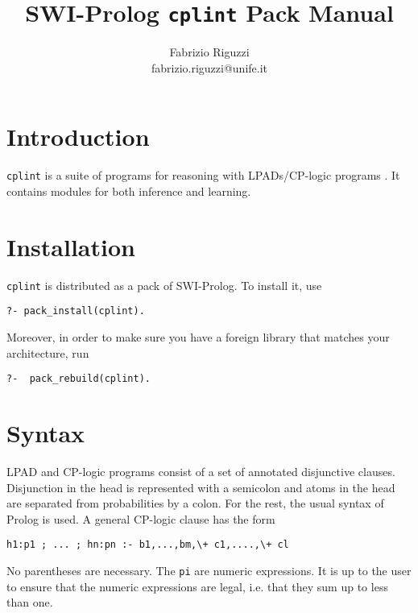 \documentclass[a4paper,10pt]{article}
\begin{document}
\title{SWI-Prolog \texttt{cplint} Pack Manual}


\author{Fabrizio Riguzzi\\
fabrizio.riguzzi@unife.it}

\maketitle


\section{Introduction}


\texttt{cplint} is a suite of programs for reasoning with LPADs/CP-logic programs  \cite{VenVer03-TR,VenVer04-ICLP04-IC,VenDenBru-JELIA06,DBLP:journals/tplp/VennekensDB09}. It contains modules for both inference and learning.

\section{Installation}
\texttt{cplint} is distributed as a pack of SWI-Prolog. To install it, use
\begin{verbatim}
?- pack_install(cplint).
\end{verbatim}
Moreover, in order to make sure you have a foreign library that matches your architecture, run
\begin{verbatim}
?-  pack_rebuild(cplint). 
\end{verbatim}


\section{Syntax}

LPAD and CP-logic programs consist of a set of annotated disjunctive clauses.
Disjunction in the head is represented with a semicolon and atoms in the head are separated from probabilities by a colon. For the rest, the usual syntax of Prolog is used.
A general CP-logic clause has the form
\begin{verbatim}
h1:p1 ; ... ; hn:pn :- b1,...,bm,\+ c1,....,\+ cl
\end{verbatim}
 No parentheses are necessary. The \texttt{pi} are numeric expressions. It is up to the user to ensure that the numeric expressions are legal, i.e. that they sum up to less than one.
\end{document}
